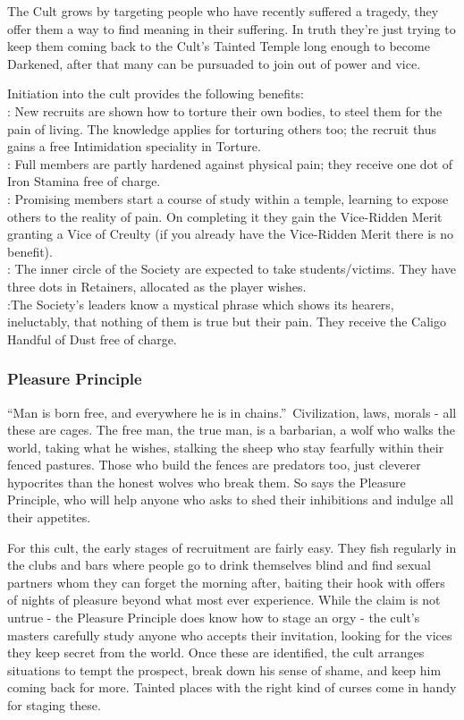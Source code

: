 The Cult grows by targeting people who have recently suffered a tragedy, they offer them a way to find meaning in their suffering. In truth they're just trying to keep them coming back to the Cult's Tainted Temple long enough to become Darkened, after that many can be pursuaded to join out of power and vice. 

Initiation into the cult provides the following benefits: \\

\noindent \textbullet: New recruits are shown how to torture their own bodies, to steel them for the pain of living. The knowledge applies for torturing others too; the recruit thus gains a free Intimidation speciality in Torture.\\
\noindent \textbullet\textbullet: Full members are partly hardened against physical pain; they receive one dot of Iron Stamina free of charge.\\
\noindent \textbullet\textbullet\textbullet: Promising members start a course of study within a temple, learning to expose others to the reality
of pain. On completing it they gain the Vice-Ridden Merit granting a Vice of Creulty (if you already have the Vice-Ridden Merit there is no benefit).\\
\noindent \textbullet\textbullet\textbullet\textbullet: The inner circle of the Society are expected to take students/victims. They have three dots in Retainers, allocated as the player wishes.\\
\noindent \textbullet\textbullet\textbullet\textbullet\textbullet:The Society’s leaders know a mystical phrase which shows its hearers, ineluctably, that nothing of them is true but their pain. They receive the Caligo Handful of Dust free of charge.

\subsubsection*{Pleasure Principle}
\textquotedblleft Man is born free, and everywhere he is in chains.\textquotedblright\, Civilization, laws, morals - all these are cages. The free man, the true man, is a barbarian, a wolf who walks the world, taking what he wishes, stalking the sheep who stay fearfully within their fenced pastures. Those who build the fences are predators too, just cleverer hypocrites than the honest wolves who break them. So says the Pleasure Principle, who will help anyone who asks to shed their inhibitions and indulge all their appetites.

For this cult, the early stages of recruitment are fairly easy. They fish regularly in the clubs and bars where people go to drink themselves blind and find sexual partners whom they can forget the morning after, baiting their hook with offers of nights of pleasure beyond what most ever experience. While the claim is not untrue - the Pleasure Principle does know how to stage an orgy - the cult’s masters carefully study anyone who accepts their invitation, looking for the vices they keep secret from the world. Once these are identified, the cult arranges situations to tempt the prospect, break down his sense of shame, and keep him coming back for more. Tainted places with the right kind of curses come in handy for staging these.

